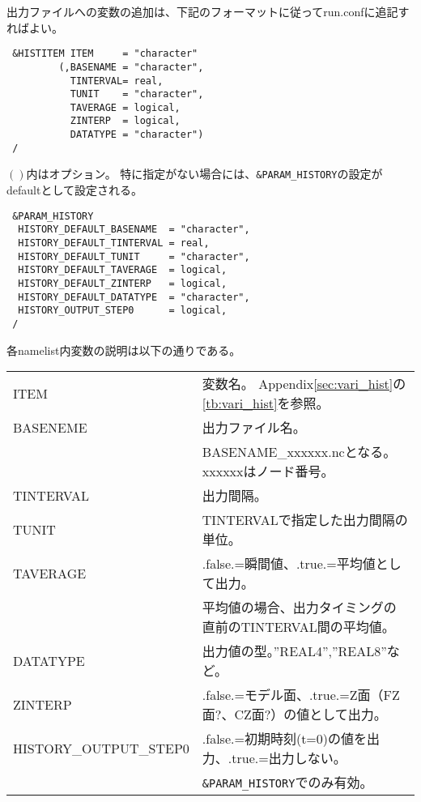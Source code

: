 出力ファイルへの変数の追加は、下記のフォーマットに従ってrun.confに追記すればよい。
\begin{verbatim}
 &HISTITEM ITEM     = "character"
         (,BASENAME = "character",
           TINTERVAL= real,
           TUNIT    = "character", 
           TAVERAGE = logical,
           ZINTERP  = logical, 
           DATATYPE = "character")
 /
\end{verbatim}
$\left( \right)$内はオプション。
特に指定がない場合には、\verb|&PARAM_HISTORY|の設定がdefaultとして設定される。
\begin{verbatim}
 &PARAM_HISTORY
  HISTORY_DEFAULT_BASENAME  = "character",
  HISTORY_DEFAULT_TINTERVAL = real,
  HISTORY_DEFAULT_TUNIT     = "character",
  HISTORY_DEFAULT_TAVERAGE  = logical,
  HISTORY_DEFAULT_ZINTERP   = logical,
  HISTORY_DEFAULT_DATATYPE  = "character",
  HISTORY_OUTPUT_STEP0      = logical,
 /
\end{verbatim}
各namelist内変数の説明は以下の通りである。\\
{\renewcommand\arraystretch{1.2}
\begin{tabular}{ll}
\hline
ITEM                   & 変数名。 Appendix\ref{sec:vari_hist}の\ref{tb:vari_hist}を参照。\\                       
BASENEME               & 出力ファイル名。\\
                       & BASENAME\_xxxxxx.ncとなる。xxxxxxはノード番号。\\
TINTERVAL              & 出力間隔。\\
TUNIT                  & TINTERVALで指定した出力間隔の単位。\\
TAVERAGE               & .false.=瞬間値、.true.=平均値として出力。\\
                       & 平均値の場合、出力タイミングの直前のTINTERVAL間の平均値。\\
DATATYPE               & 出力値の型。''REAL4'',''REAL8''など。\\
ZINTERP                & .false.=モデル面、.true.=Z面（FZ面$?$、CZ面$?$）の値として出力。\\
HISTORY\_OUTPUT\_STEP0 & .false.=初期時刻(t=0)の値を出力、.true.=出力しない。\\
                       & \verb|&PARAM_HISTORY|でのみ有効。\\
\hline
\end{tabular}
}\\

